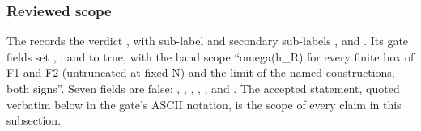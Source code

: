 \subsubsection{Reviewed scope}
\label{sec:bd2-scope}
The  records the
verdict , with sub-label
 and secondary sub-labels
,  and
. Its gate fields set
, ,
 and  to true, with
the band scope ``omega(h\_R) for every finite box of F1 and F2 (untruncated at
fixed N) and the limit of the named constructions, both signs''. Seven
fields are false: , ,
, ,
,  and
. The accepted statement, quoted
verbatim below in the gate's ASCII notation, is the scope of every claim in
this subsection.
